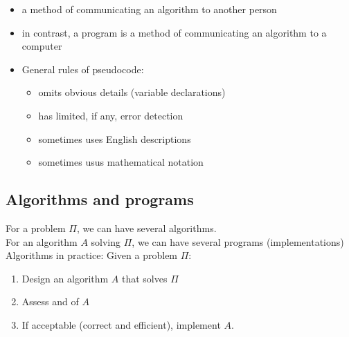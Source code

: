 \documentclass[letterpaper, 12pt]{article}
\newcommand{\red}[1]{{\color{red}{#1}}}
\begin{document}
    \red{Pseudocode}
    \begin{itemize}
        \item a method of communicating an algorithm to another person
        \item in contrast, a program is a method of communicating an algorithm to a computer
        \item General rules of pseudocode:
        \begin{itemize}
            \item omits obvious details (variable declarations)
            \item has limited, if any, error detection
            \item sometimes uses English descriptions
            \item sometimes usus mathematical notation
        \end{itemize}
    \end{itemize}
    \pagebreak
    \subsection{Algorithms and programs}
    For a problem $\Pi$, we can have several algorithms.\\
    For an algorithm $A$ solving $\Pi$, we can have several programs (implementations)\\
    \bigskip
    Algorithms in practice: Given a problem $\Pi$:\\
    \begin{enumerate}
        \item \textbf{\red{Algorithm Design:}} Design an algorithm $A$ that solves $\Pi$
        \item \textbf{\red{Algorithm Analysis:}} Assess \red{correctness} and \red{efficiency} of $A$
        \item If acceptable (correct and efficient), implement $A$.
    \end{enumerate}
    
\end{document}
